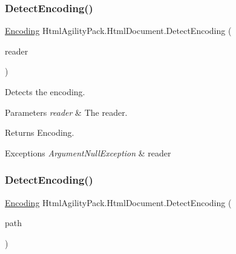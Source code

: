 \subsubsection{\texorpdfstring{Detect\+Encoding()}{DetectEncoding()}\hspace{0.1cm}{\footnotesize\ttfamily [2/3]}}
{\footnotesize\ttfamily \hyperlink{class_html_agility_pack_1_1_html_document_a220bdf28a5e35f4898075084be2d59f0}{Encoding} Html\+Agility\+Pack.\+Html\+Document.\+Detect\+Encoding (\begin{DoxyParamCaption}\item[{Text\+Reader}]{reader }\end{DoxyParamCaption})\hspace{0.3cm}{\ttfamily [inline]}}



Detects the encoding. 


\begin{DoxyParams}{Parameters}
{\em reader} & The reader.\\
\hline
\end{DoxyParams}
\begin{DoxyReturn}{Returns}
Encoding.
\end{DoxyReturn}

\begin{DoxyExceptions}{Exceptions}
{\em Argument\+Null\+Exception} & reader\\
\hline
\end{DoxyExceptions}
\mbox{\label{class_html_agility_pack_1_1_html_document_a76392972fe9d293f4715b662cf258df5}} 
\subsubsection{\texorpdfstring{Detect\+Encoding()}{DetectEncoding()}\hspace{0.1cm}{\footnotesize\ttfamily [3/3]}}
{\footnotesize\ttfamily \hyperlink{class_html_agility_pack_1_1_html_document_a220bdf28a5e35f4898075084be2d59f0}{Encoding} Html\+Agility\+Pack.\+Html\+Document.\+Detect\+Encoding (\begin{DoxyParamCaption}\item[{string}]{path }\end{DoxyParamCaption})\hspace{0.3cm}{\ttfamily [inline]}}



